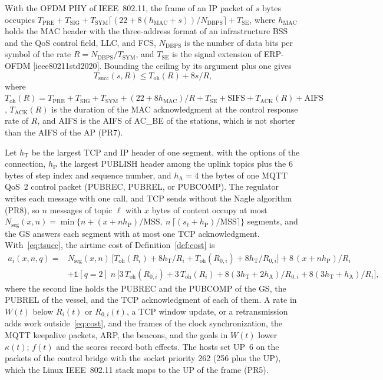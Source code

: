 With the OFDM PHY of IEEE~802.11, the frame of an IP packet of $s$ bytes occupies $T_{\mathrm{PRE}} + T_{\mathrm{SIG}} + T_{\mathrm{SYM}}\lceil (22 + 8(h_{\mathrm{MAC}} + s))/N_{\mathrm{DBPS}} \rceil + T_{\mathrm{SE}}$, where $h_{\mathrm{MAC}}$ holds the MAC header with the three-address format of an infrastructure BSS and the QoS control field, LLC, and FCS, $N_{\mathrm{DBPS}}$ is the number of data bits per symbol of the rate $R = N_{\mathrm{DBPS}}/T_{\mathrm{SYM}}$, and $T_{\mathrm{SE}}$ is the signal extension of ERP-OFDM [ieee80211std2020]. Bounding the ceiling by its argument plus one gives
\begin{equation}
T_{\mathrm{succ}}(s, R) \leq T_{\mathrm{oh}}(R) + 8s/R,
\label{eq:tsucc}
\end{equation}
where $T_{\mathrm{oh}}(R) = T_{\mathrm{PRE}} + T_{\mathrm{SIG}} + T_{\mathrm{SYM}} + (22 + 8h_{\mathrm{MAC}})/R + T_{\mathrm{SE}} + \mathrm{SIFS} + T_{\mathrm{ACK}}(R) + \mathrm{AIFS}$, $T_{\mathrm{ACK}}(R)$ is the duration of the MAC acknowledgment at the control response rate of $R$, and AIFS is the AIFS of AC\_BE of the stations, which is not shorter than the AIFS of the AP (PR7).

Let $h_{\mathrm{T}}$ be the largest TCP and IP header of one segment, with the options of the connection, $h_{\mathrm{P}}$ the largest PUBLISH header among the uplink topics plus the 6 bytes of step index and sequence number, and $h_{\mathrm{A}} = 4$ the bytes of one MQTT QoS~2 control packet (PUBREC, PUBREL, or PUBCOMP). The regulator writes each message with one call, and TCP sends without the Nagle algorithm (PR8), so $n$ messages of topic $\ell$ with $x$ bytes of content occupy at most $N_{\mathrm{seg}}(x, n) = \min\{n + (x + n h_{\mathrm{P}})/\mathrm{MSS},\ n\,\lceil (s_\ell + h_{\mathrm{P}})/\mathrm{MSS} \rceil\}$ segments, and the GS answers each segment with at most one TCP acknowledgment. With~\eqref{eq:tsucc}, the airtime cost of Definition~\ref{def:cost} is
\begin{equation}
\begin{aligned}
a_i(x, n, q) ={}& N_{\mathrm{seg}}(x, n)\,\big[T_{\mathrm{oh}}(R_i) + 8h_{\mathrm{T}}/R_i + T_{\mathrm{oh}}(R_{0,i}) + 8h_{\mathrm{T}}/R_{0,i}\big] + 8\,(x + n h_{\mathrm{P}})/R_i \\
&+ \mathbb{1}[q = 2]\; n\,\big[3\,T_{\mathrm{oh}}(R_{0,i}) + 3\,T_{\mathrm{oh}}(R_i) + 8(3h_{\mathrm{T}} + 2h_{\mathrm{A}})/R_{0,i} + 8(3h_{\mathrm{T}} + h_{\mathrm{A}})/R_i\big],
\end{aligned}
\label{eq:cost}
\end{equation}
where the second line holds the PUBREC and the PUBCOMP of the GS, the PUBREL of the vessel, and the TCP acknowledgment of each of them. A rate in $W(t)$ below $R_i(t)$ or $R_{0,i}(t)$, a TCP window update, or a retransmission adds work outside~\eqref{eq:cost}, and the frames of the clock synchronization, the MQTT keepalive packets, ARP, the beacons, and the goals in $W(t)$ lower $\kappa(t)$; $f(t)$ and the scores record both effects. The hosts set UP~6 on the packets of the control bridge with the socket priority 262 (256 plus the UP), which the Linux IEEE~802.11 stack maps to the UP of the frame (PR5).

